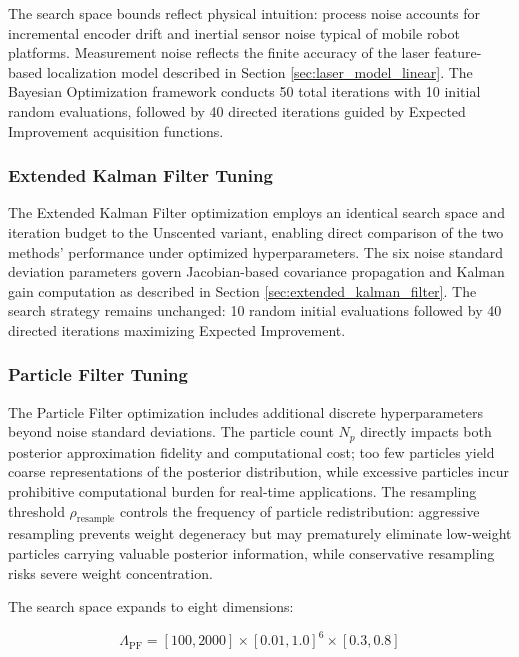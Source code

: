 \documentclass[conference]{IEEEtran}
\begin{document}
The search space bounds reflect physical intuition: process noise accounts for incremental encoder drift and inertial sensor noise typical of mobile robot platforms. Measurement noise reflects the finite accuracy of the laser feature-based localization model described in Section \ref{sec:laser_model_linear}. The Bayesian Optimization framework conducts 50 total iterations with 10 initial random evaluations, followed by 40 directed iterations guided by Expected Improvement acquisition functions.

\subsubsection{Extended Kalman Filter Tuning}

The Extended Kalman Filter optimization employs an identical search space and iteration budget to the Unscented variant, enabling direct comparison of the two methods' performance under optimized hyperparameters. The six noise standard deviation parameters govern Jacobian-based covariance propagation and Kalman gain computation as described in Section \ref{sec:extended_kalman_filter}. The search strategy remains unchanged: 10 random initial evaluations followed by 40 directed iterations maximizing Expected Improvement.

\subsubsection{Particle Filter Tuning}

The Particle Filter optimization includes additional discrete hyperparameters beyond noise standard deviations. The particle count $N_p$ directly impacts both posterior approximation fidelity and computational cost; too few particles yield coarse representations of the posterior distribution, while excessive particles incur prohibitive computational burden for real-time applications. The resampling threshold $\rho_{\text{resample}}$ controls the frequency of particle redistribution: aggressive resampling prevents weight degeneracy but may prematurely eliminate low-weight particles carrying valuable posterior information, while conservative resampling risks severe weight concentration.

The search space expands to eight dimensions:

\begin{equation}
    \Lambda_{\text{PF}} = [100, 2000] \times [0.01, 1.0]^6 \times [0.3, 0.8]
\end{equation}
\end{document}

